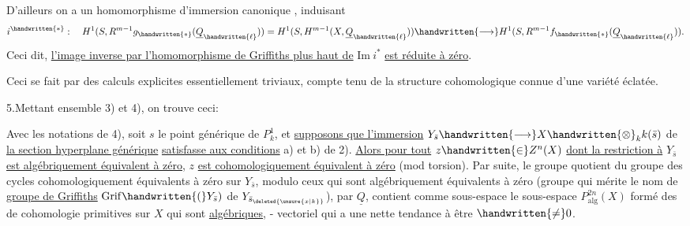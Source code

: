 D'ailleurs  on a un homomorphisme d'immersion canonique
\noindent ,
induisant
\[
i^{\handwritten{*}}:\quad H^1(S,R^{m-1}g_{\handwritten{*}}(\underline{Q}_{\handwritten{\ell}}))=H^1(S,H^{m-1}(X,\underline{Q}_{\handwritten{\ell}}))\handwritten{\longrightarrow}H^1(S,R^{m-1}f_{\handwritten{*}}(\underline{Q}_{\handwritten{\ell}})).
\]
Ceci dit, \uline{l'image inverse par l'homomorphisme de Griffiths plus haut de} $\mathrm{Im}\ i^*$ \uline{est réduite à zéro}.

Ceci se fait par des calculs explicites essentiellement triviaux, compte tenu de la structure cohomologique connue d'une variété éclatée.

5.\quad Mettant ensemble 3) et 4), on trouve ceci:

 Avec les notations de 4),  soit $s$ le point générique de $P^1_k$, et \uline{supposons que l'immersion} $Y_{\bar s}\handwritten{\longrightarrow}X\handwritten{\otimes}_k k(\bar s)$ de \uline{la section hyperplane générique}  \uline{satisfasse aux conditions} a) et b) de 2). \uline{Alors pour tout} $z\handwritten{\in}Z^n(X)$ \uline{dont la restriction à} $Y_{\bar s}$ \uline{est algébriquement équivalent à zéro}, $z$ \uline{est cohomologiquement équivalent à zéro} (mod torsion).  Par suite, le groupe quotient du groupe des cycles cohomologiquement équivalents à zéro  sur $Y_{\bar s}$, modulo ceux qui sont algébriquement équivalents à zéro (groupe qui mérite le nom de \uline{groupe de Griffiths} $\mathrm{Grif}\handwritten{(}Y_{\bar s})$ de $Y_{\bar s_{\deleted{\unsure{x|k}}}}$),  par $\underline{Q}$, contient comme sous-espace le sous-espace $P^{2n}_{\mathrm{alg}}(X)$ formé des  de cohomologie primitives sur $X$ qui sont \uline{algébriques}, - vectoriel qui a
une nette tendance à être $\handwritten{\ne}0$.

